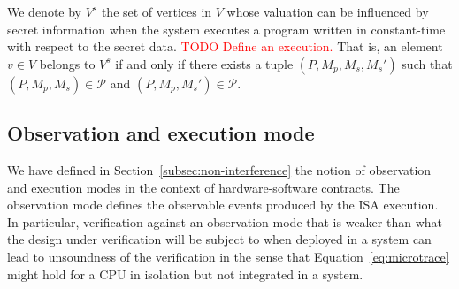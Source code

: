 We denote by $V^s$ the set of vertices in $V$ whose valuation can be influenced by secret information when the system executes a program written in constant-time with respect to the secret data.
\textcolor{red}{TODO Define an execution.}
That is, an element $v \in V$ belongs to $V^s$ if and only if there exists a tuple $(P, M_p, M_s, M_s')$ such that $(P, M_p, M_s) \in \mathcal{P}$ and $(P, M_p, M_s') \in \mathcal{P}$.




\subsection{Observation and execution mode}
\label{subsec:observation_mode}

We have defined in Section~\ref{subsec:non-interference} the notion of observation and execution modes in the context of hardware-software contracts.
The observation mode defines the observable events produced by the ISA execution.
In particular, verification against an observation mode that is weaker than what the design under verification will be subject to when deployed in a system can lead to unsoundness of the verification in the sense that Equation~\ref{eq:microtrace} might hold for a CPU in isolation but not integrated in a system.


